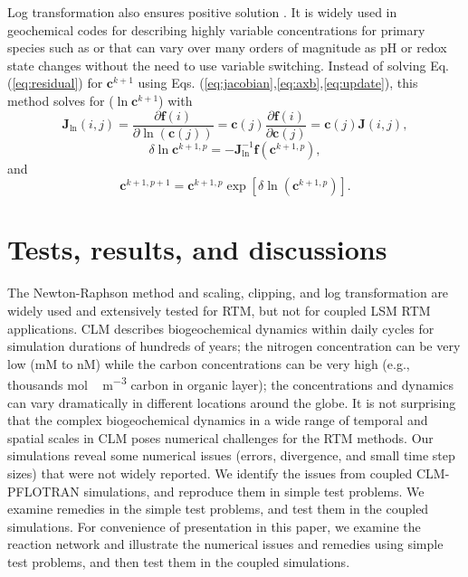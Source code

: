 \documentclass[gmd, manuscript]{copernicus}
\begin{document}
Log transformation also ensures positive solution
\citep{Bethke2007,Hammond2003,Parkhurst1999}. It is widely used in geochemical
codes for describing highly variable concentrations for primary species such as
 or  that can vary over many orders of magnitude as pH or
redox state changes without the need to use variable switching. Instead of
solving Eq. (\ref{eq:residual}) for $\mathbf{c}^{k+1}$ using Eqs.
(\ref{eq:jacobian},\ref{eq:axb},\ref{eq:update}), this method solves for
($\ln\mathbf{c}^{k+1}$) \citep{Hammond2003} with 
\begin{equation}
\mathbf{J}_{\ln}(i,j)=\frac{\partial \mathbf{f}(i)}{\partial
\ln(\mathbf{c}(j))} = \mathbf{c}(j) \frac{\partial
\mathbf{f}(i)}{\partial \mathbf{c}(j)} = \mathbf{c}(j) \mathbf{J}(i,j),
\label{eq:jacobianlt}
\end{equation}
\begin{equation}
\delta \ln\mathbf{c}^{k+1,p}= -\mathbf{J}^{-1}_{\ln} \mathbf{f} (\mathbf{c}^{k+1,p}),
\label{eq:axblt}
\end{equation}
and
\begin{equation}
\mathbf{c}^{k+1,p+1}=\mathbf{c}^{k+1,p}\exp\left[\delta
\ln(\mathbf{c}^{k+1,p})\right].
\label{eq:updatelt}	
\end{equation}

\section{Tests, results, and discussions}
The Newton-Raphson method and scaling, clipping, and log transformation are
widely used and extensively tested for RTM, but not for coupled LSM RTM applications. CLM
describes biogeochemical dynamics within daily cycles for simulation durations
of hundreds of years; the nitrogen concentration can be very low (\unit{mM} to
\unit{nM}) while the carbon concentrations can be very high (e.g., thousands
\unit{mol\,m^{-3}} carbon in organic layer); the concentrations and dynamics
can vary dramatically in different locations around the globe. It is not
surprising that the complex biogeochemical dynamics in a wide range of temporal
and spatial scales in CLM poses numerical challenges for the RTM methods. Our
simulations reveal some numerical issues (errors, divergence, and small time
step sizes) that were not widely reported. We identify the issues from coupled
CLM-PFLOTRAN simulations, and reproduce them in simple test problems. We
examine remedies in the simple test problems, and test them in the coupled
simulations. For convenience of presentation in this paper, we examine the
reaction network and illustrate the numerical issues and remedies using simple
test problems, and then test them in the coupled simulations. 
\end{document}
